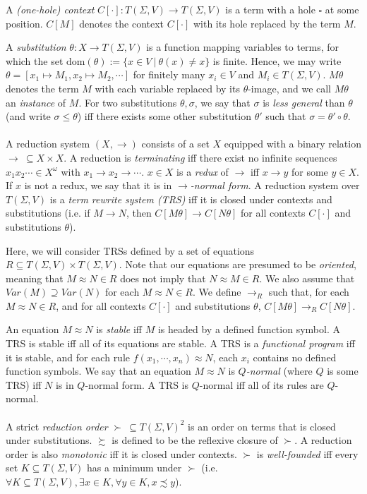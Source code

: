 \documentclass{article}
\theoremstyle{definition}
\begin{document}
A \emph{(one-hole) context} $C[\cdot] : T(\Sigma, V) \rightarrow T(\Sigma, V)$ is a term with a hole $\square$ at some position. $C[M]$ denotes the context $C[\cdot]$ with its hole replaced by the term $M$. 

A \emph{substitution} $\theta : X \rightarrow T(\Sigma, V)$ is a function mapping variables to terms, for which the set $\text{dom}(\theta) := \{ x \in V ~|~ \theta(x) \neq x\}$ is finite. Hence, we may write $\theta = [x_1 \mapsto M_1, x_2 \mapsto M_2, \cdots]$ for finitely many $x_i \in V$ and $M_i \in T(\Sigma,V)$. $M \theta$ denotes the term $M$ with each variable replaced by its $\theta$-image, and we call $M\theta$ an \emph{instance} of $M$. For two substitutions $\theta, \sigma$, we say that $\sigma$ is \emph{less general} than $\theta$ (and write $\sigma \leq \theta$) iff there exists some other substitution $\theta'$ such that $\sigma = \theta' \circ \theta$.
\\~\\
A reduction system $(X, \rightarrow)$ consists of a set $X$ equipped with a binary relation $\rightarrow ~\subseteq X \times X$. A reduction is \emph{terminating} iff there exist no infinite sequences $x_1x_2 \cdots \in X^\omega$ with $x_1 \rightarrow x_2 \rightarrow \cdots$. $x \in X$ is a \emph{redux} of $\rightarrow$ iff $x \rightarrow y$ for some $y \in X$. If $x$ is not a redux, we say that it is in \emph{$\rightarrow$-normal form}. A reduction system over $T(\Sigma, V)$ is a \emph{term rewrite system (TRS)} iff it is closed under contexts and substitutions (i.e. if $M \rightarrow N$, then $C[M\theta] \rightarrow C[N\theta]$ for all contexts $C[\cdot]$ and substitutions $\theta$). 

Here, we will consider TRSs defined by a set of equations $R \subseteq T(\Sigma, V) \times T(\Sigma, V)$. Note that our equations are presumed to be \emph{oriented}, meaning that $M \approx N \in R$ does not imply that $N \approx M \in R$. We also assume that $Var(M) \supseteq Var(N)$ for each $M \approx N \in R$. We define $\rightarrow_R$ such that, for each $M \approx N \in R$, and for all contexts $C[\cdot]$ and substitutions $\theta$, $C[M\theta] \rightarrow_R C[N\theta]$. 

An equation $M \approx N$ is \emph{stable} iff $M$ is headed by a defined function symbol. A TRS is stable iff all of its equations are stable. A TRS is a \emph{functional program} iff it is stable, and for each rule $f(x_1, \cdots, x_n) \approx N$, each $x_i$ contains no defined function symbols. We say that an equation $M \approx N$ is \emph{$Q$-normal} (where $Q$ is some TRS) iff $N$ is in $Q$-normal form. A TRS is $Q$-normal iff all of its rules are $Q$-normal.  
\\~\\
A strict \emph{reduction order} $\succ ~ \subseteq T(\Sigma, V)^2$ is an order on terms that is closed under substitutions.  $\succsim$ is defined to be the reflexive closure of $\succ$. A reduction order is also \emph{monotonic} iff it is closed under contexts. $\succ$ is \emph{well-founded} iff every set $K \subseteq T(\Sigma, V)$ has a minimum under $\succ$ (i.e. $\forall K \subseteq T(\Sigma, V), \exists x \in K, \forall y \in K, x \precsim y$).
\end{document}
